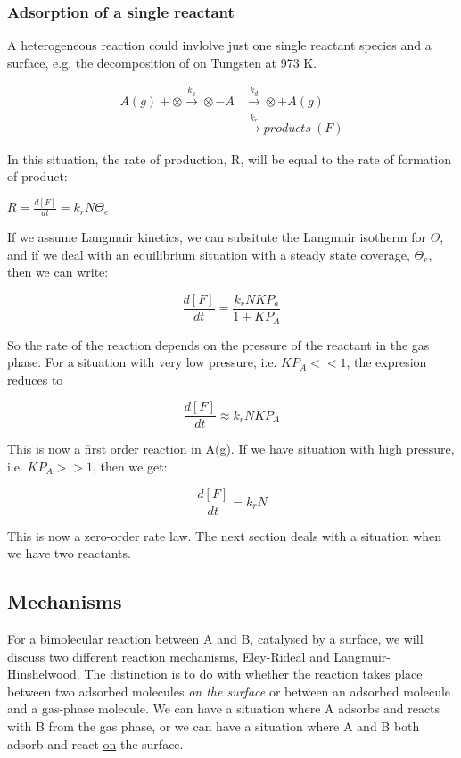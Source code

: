 \documentclass[ignorenonframetext]{beamer}
\begin{document}
\subsubsection{Adsorption of a single reactant}

A heterogeneous reaction could invlolve just one single reactant species and a surface, e.g. the decomposition of  on Tungsten at 973 K.

\begin{align*}
A(g) + \otimes \xrightarrow{k_a} \otimes-A &\xrightarrow{k_d} \otimes + A(g)\\
&\xrightarrow{k_r} products\ (F)
\end{align*}

In this situation, the rate of production, R, will be equal to the rate of formation of product:

\(R = \frac{d[F]}{dt} = k_rN\Theta_e\)

\medskip If we assume Langmuir kinetics, we can subsitute the Langmuir isotherm for \(\Theta\), and if we deal with an equilibrium situation with a steady state coverage, \(\Theta_e\), then we can write:

\[\frac{d[F]}{dt} = \frac{k_rNKP_a}{1+KP_A}\]

So the rate of the reaction depends on the pressure of the reactant in the gas phase. For a situation with very low pressure, i.e. \(KP_A << 1\), the expresion reduces to 

\[\frac{d[F]}{dt} \approx k_rNKP_A\]

This is now a first order reaction in A(g). If we have situation with high pressure, i.e. \(KP_A >> 1\), then we get:

\[\frac{d[F]}{dt} = k_rN\]

This is now a zero-order rate law. The next section deals with a situation when we have two reactants.

\subsection{Mechanisms}

For a bimolecular reaction between A and B, catalysed by a surface, we will discuss two different reaction mechanisms, Eley-Rideal and Langmuir-Hinshelwood. The distinction is to do with whether the reaction takes place between two adsorbed molecules \textit{on the surface} or between an adsorbed molecule and a gas-phase molecule. We can have a situation where A adsorbs and reacts with B from the gas phase, or we can have a situation where A and B both adsorb and react \underline{on} the surface.
\end{document}
